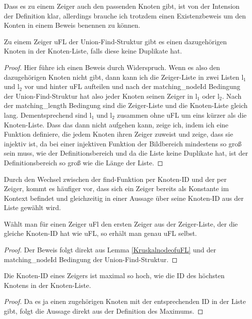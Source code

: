 Dass es zu einem Zeiger auch den passenden Knoten gibt, ist von der Intension der Definition klar,
allerdings brauche ich trotzdem einen Existenzbeweis um den Konten in einem Beweis benennen zu können.

\begin{lemma}[\KruskalnodeofuFL]\label{KruskalnodeofuFL}
  Zu einem Zeiger uFL der Union-Find-Struktur gibt es einen dazugehörigen Knoten in der Knoten-Liste, falls diese keine Duplikate hat.
\end{lemma}
\begin{proof}
  Hier führe ich einen Beweis durch Widerspruch.
  Wenn es also den dazugehörigen Knoten nicht gibt, dann kann ich die Zeiger-Liste in zwei Listen l$_1$ und l$_2$ vor und hinter uFL aufteilen
  und nach der matching\_nodeId Bedingung der Union-Find-Struktur hat also jeder Knoten seinen Zeiger in l$_1$ oder l$_2$.
  Nach der matching\_length Bedingung sind die Zeiger-Liste und die Knoten-Liste gleich lang.
  Dementsprechend sind l$_1$ und l$_2$ zusammen ohne uFL um eins kürzer als die Knoten-Liste.
  Dass das dann nicht aufgehen kann, zeige ich, indem ich eine Funktion definiere, die jedem Knoten ihren Zeiger zuweist und zeige, dass sie injektiv ist,
  da bei einer injektiven Funktion der Bildbereich mindestens so groß sein muss, wie der Definitionsbereich
  und da die Liste keine Duplikate hat, ist der Definitionsbereich so groß wie die Länge der Liste.
\end{proof}

Durch den Wechsel zwischen der find-Funktion per Knoten-ID und der per Zeiger, kommt es häufiger vor,
dass sich ein Zeiger bereits als Konstante im Kontext befindet und gleichzeitig in einer Aussage über seine Knoten-ID aus der Liste gewählt wird.

\begin{lemma}[\KruskaluFLchooseself]
  Wählt man für einen Zeiger uFl den ersten Zeiger aus der Zeiger-Liste, der die gleiche Knoten-ID hat wie uFL, so erhält man genau uFL selbst.
\end{lemma}
\begin{proof}
  Der Beweis folgt direkt aus Lemma \ref{KruskalnodeofuFL} und der matching\_nodeId Bedingung der Union-Find-Struktur.
\end{proof}



\begin{lemma}[\KruskalnodeIdltmax]
  Die Knoten-ID eines Zeigers ist maximal so hoch, wie die ID des höchsten Knotens in der Knoten-Liste.
\end{lemma}
\begin{proof}
  Da es ja einen zugehörigen Knoten mit der entsprechenden ID in der Liste gibt, folgt die Aussage direkt aus der Definition des Maximums.
\end{proof}



